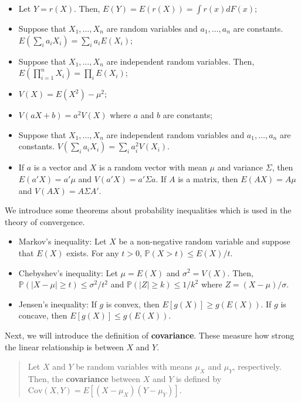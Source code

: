 \documentclass[
  12pt,
]{article}
\providecommand{\tightlist}{%
  \setlength{\itemsep}{0pt}\setlength{\parskip}{0pt}}
\begin{document}
\begin{itemize}
\tightlist
\item
  Let \(Y = r(X)\). Then, \(E(Y) = E(r(X)) = \int r(x) dF(x)\);
\item
  Suppose that \(X_1, \ldots, X_n\) are random variables and
  \(a_1, \ldots, a_n\) are constants.
  \(E(\sum_i a_i X_i) = \sum_i a_i E(X_i)\);
\item
  Suppose that \(X_1, \ldots, X_n\) are independent random variables.
  Then, \(E(\prod_{i=1}^n X_i) = \prod_i E(X_i)\);
\item
  \(V(X) = E(X^2) - \mu^2\);
\item
  \(V(aX + b) = a^2 V(X)\) where \(a\) and \(b\) are constants;
\item
  Suppose that \(X_1, \ldots, X_n\) are independent random variables and
  \(a_1, \ldots, a_n\) are constants.
  \(V(\sum_i a_i X_i) = \sum_i a_i^2 V(X_i)\).
\item
  If \(a\) is a vector and \(X\) is a random vector with mean \(\mu\)
  and variance \(\Sigma\), then \(E(a'X) = a'\mu\) and
  \(V(a'X) = a'\Sigma a\). If \(A\) is a matrix, then \(E(AX) = A\mu\)
  and \(V(AX) = A\Sigma A'\).
\end{itemize}

We introduce some theorems about probability inequalities which is used
in the theory of convergence.

\begin{itemize}
\tightlist
\item
  Markov's inequality: Let \(X\) be a non-negative random variable and
  suppose that \(E(X)\) exists. For any \(t > 0\),
  \(\mathbb{P}(X > t) \le E(X)/t\).
\item
  Chebyshev's inequality: Let \(\mu = E(X)\) and \(\sigma^2 = V(X)\).
  Then, \(\mathbb{P}(|X - \mu| \ge t) \le \sigma^2/t^2\) and
  \(\mathbb{P}(|Z| \ge k) \le 1/k^2\) where \(Z = (X - \mu)/\sigma\).
\item
  Jensen's inequality: If \(g\) is convex, then
  \(E[ g(X) ] \ge g(E(X))\). If \(g\) is concave, then
  \(E[ g(X) ] \le g(E(X))\).
\end{itemize}

Next, we will introduce the definition of \textbf{covariance}. These
measure how strong the linear relationship is between \(X\) and \(Y\).

\begin{quote}
Let \(X\) and \(Y\) be random variables with means \(\mu_X\) and
\(\mu_Y\), respectively. Then, the \textbf{covariance} between \(X\) and
\(Y\) is defined by \(\mathrm{Cov}(X, Y) = E[(X - \mu_X)(Y - \mu_Y)]\).
\end{quote}
\end{document}

